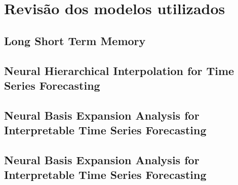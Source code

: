 \chapter{Revisão dos modelos utilizados}

\section{Long Short Term Memory}
\section{Neural Hierarchical Interpolation for Time Series Forecasting}
\section{Neural Basis Expansion Analysis for Interpretable Time Series Forecasting}
\section{Neural Basis Expansion Analysis for Interpretable Time Series Forecasting}